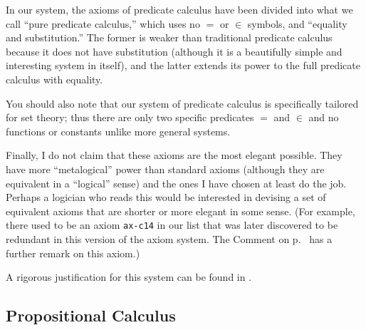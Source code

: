 In our system, the axioms of predicate calculus have been divided into what we
call ``pure predicate calculus,'' which uses no $=$ or $\in$ symbols, and
``equality and substitution.''  The former is weaker than traditional
predicate calculus because it does not have substitution (although it is a
beautifully simple and interesting system in itself), and the latter extends
its power to the full predicate calculus with equality.

You should also note that our system of predicate calculus is specifically
tailored for set theory; thus there are only two specific predicates $=$ and
$\in$ and no functions
or constants unlike more general systems.

Finally, I do not claim that these axioms are the most elegant possible.
They have more ``metalogical'' power than standard
axioms (although they are equivalent in a ``logical'' sense) and the
ones I have chosen at least do the job.  Perhaps a logician who reads
this would be interested in devising a set of equivalent axioms that are
shorter or more elegant in some sense.
(For example, there used to be an axiom \texttt{ax-c14} in our list that
was later discovered to be redundant in this version of the axiom
system.  The Comment on p.~\pageref{nodd} has a further remark on this axiom.)

A rigorous justification for this system can be found in
\cite{Megill}.

\newbox\mlinebox
\newbox\mtrialbox
\newbox\startprefix  %
\newbox\contprefix  %
\def\startm{  %
  \setbox\mlinebox=\hbox{\unhcopy\startprefix}
}
\def\m#1{  %
  \setbox\mtrialbox=\hbox{\unhcopy\mlinebox $\,#1$}
  \ifdim\wd\mtrialbox>\hsize
    \box\mlinebox
    \setbox\mlinebox=\hbox{\unhcopy\contprefix $\,#1$}
  \else
    \setbox\mlinebox=\hbox{\unhbox\mtrialbox}
  \fi
}
\def\endm{  %
  \box\mlinebox
}



\subsection{Propositional Calculus}\label{propcalc}

